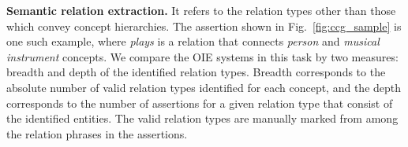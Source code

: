 \documentclass{llncs}
\begin{document}
\medskip
\noindent
\textbf{Semantic relation extraction.} It refers to the relation types other than those which convey concept hierarchies. The assertion shown in Fig.~\ref{fig:ccg_sample} is one such example, where \textit{plays} is a relation that connects \textit{person} and \textit{musical instrument} concepts. We compare the OIE systems in this task by two measures: breadth and depth of the identified relation types. Breadth corresponds to the absolute number of valid relation types identified for each concept, and the depth corresponds to the number of assertions for a given relation type that consist of the identified entities. The valid relation types are manually marked from among the relation phrases in the assertions.
\end{document}
